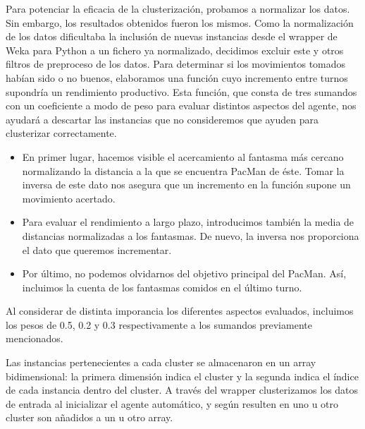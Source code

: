 \documentclass[12pt]{article}
\begin{document}

Para potenciar la eficacia de la clusterización, probamos a normalizar los datos. Sin embargo, los resultados obtenidos fueron los mismos. Como la normalización de los datos dificultaba la inclusión de nuevas instancias desde el wrapper de Weka para Python a un fichero ya normalizado, decidimos excluir este y otros filtros de preproceso de los datos. Para determinar si los movimientos tomados habían sido o no buenos, elaboramos una función cuyo incremento entre turnos supondría un rendimiento productivo. Esta función, que consta de tres sumandos con un coeficiente a modo de peso para evaluar distintos aspectos del agente, nos ayudará a descartar las instancias que no consideremos que ayuden para clusterizar correctamente.

\begin{itemize}
    \item En primer lugar, hacemos visible el acercamiento al fantasma más cercano normalizando la distancia a la que se encuentra PacMan de éste. Tomar la inversa de este dato nos asegura que un incremento en la función supone un movimiento acertado.
    \item Para evaluar el rendimiento a largo plazo, introducimos también la media de distancias normalizadas a los fantasmas. De nuevo, la inversa nos proporciona el dato que queremos incrementar.
    \item Por último, no podemos olvidarnos del objetivo principal del PacMan. Así, incluimos la cuenta de los fantasmas comidos en el último turno.
\end{itemize}

Al considerar de distinta imporancia los diferentes aspectos evaluados, incluimos los pesos de 0.5, 0.2 y 0.3 respectivamente a los sumandos previamente mencionados.


Las instancias pertenecientes a cada cluster se almacenaron en un array bidimensional: la primera dimensión indica el cluster y la segunda indica el índice de cada instancia dentro del cluster. A través del wrapper clusterizamos los datos de entrada al inicializar el agente automático, y según resulten en uno u otro cluster son añadidos a un u otro array.

\end{document}
